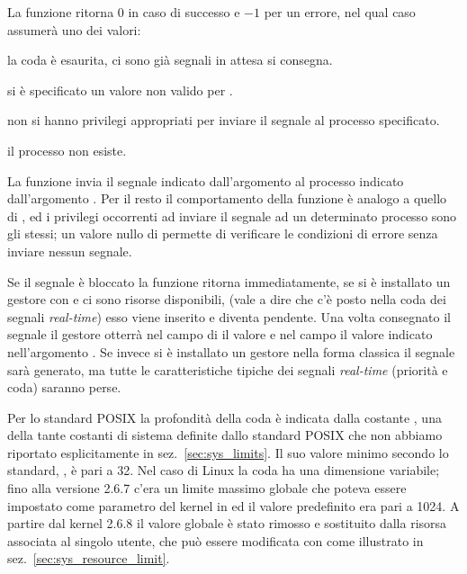 \begin{funcproto}{
}

{La funzione ritorna $0$ in caso di successo e $-1$ per un errore, nel qual
  caso  assumerà uno dei valori: 
  \begin{errlist}
  \item[\errcode{EAGAIN}] la coda è esaurita, ci sono già
     segnali in attesa si consegna.
  \item[\errcode{EINVAL}] si è specificato un valore non valido per
    .
  \item[\errcode{EPERM}] non si hanno privilegi appropriati per inviare il
    segnale al processo specificato.
  \item[\errcode{ESRCH}] il processo  non esiste.
  \end{errlist}
}
\end{funcproto}


La funzione invia il segnale indicato dall'argomento  al processo
indicato dall'argomento . Per il resto il comportamento della
funzione è analogo a quello di , ed i privilegi occorrenti ad
inviare il segnale ad un determinato processo sono gli stessi; un valore nullo
di  permette di verificare le condizioni di errore senza inviare
nessun segnale.

Se il segnale è bloccato la funzione ritorna immediatamente, se si è
installato un gestore con  e ci sono risorse disponibili,
(vale a dire che c'è posto nella coda dei segnali \textit{real-time}) esso
viene inserito e diventa pendente. Una volta consegnato il segnale il gestore
otterrà nel campo  di  il valore
 e nel campo  il valore indicato
nell'argomento . Se invece si è installato un gestore nella forma
classica il segnale sarà generato, ma tutte le caratteristiche tipiche dei
segnali \textit{real-time} (priorità e coda) saranno perse.

Per lo standard POSIX la profondità della coda è indicata dalla costante
, una della tante costanti di sistema definite dallo
standard POSIX che non abbiamo riportato esplicitamente in
sez.~\ref{sec:sys_limits}. Il suo valore minimo secondo lo standard,
, è pari a 32. Nel caso di Linux la coda ha una
dimensione variabile; fino alla versione 2.6.7 c'era un limite massimo globale
che poteva essere impostato come parametro del kernel in
 ed il valore predefinito era pari a 1024. A
partire dal kernel 2.6.8 il valore globale è stato rimosso e sostituito dalla
risorsa  associata al singolo utente, che può essere
modificata con  come illustrato in
sez.~\ref{sec:sys_resource_limit}.

